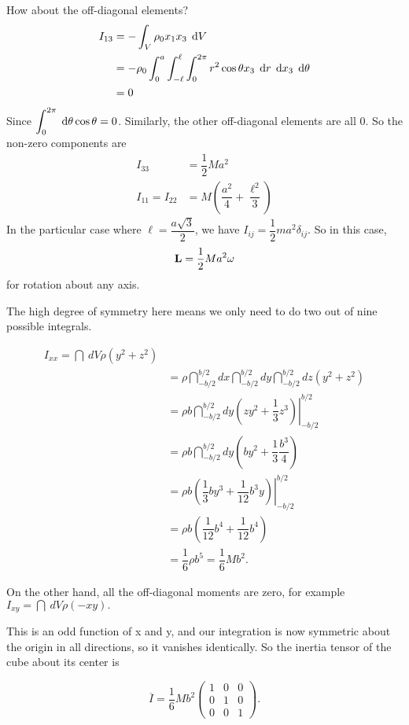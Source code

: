\begin{exa}
  How about the off-diagonal elements?
  \begin{align*}
    I_{13} &= -\dint_V \rho_0 x_1 x_3 \;\d V\\
    &= -\rho_0 \dint_0^a \dint_{-\ell}^\ell \dint_0^{2\pi} r^2 \cos \theta x_3 \;\d r\;\d x_3 \;\d \theta\\
    &= 0
  \end{align*}
  Since $\dint_0^{2\pi} \;\d \theta \cos \theta = 0$. Similarly, the other off-diagonal elements are all 0. So the non-zero components are
  \begin{align*}
    I_{33} &= \dfrac{1}{2}Ma^2\\
    I_{11} = I_{22} &= M\left(\dfrac{a^2}{4} + \dfrac{\ell^2}{3}\right)
  \end{align*}
  In the particular case where $\ell = \dfrac{a\sqrt{3}}{2}$, we have $I_{ij} = \dfrac{1}{2}ma^2 \delta_{ij}$. So in this case,
  \[
    \mathbf{ L} = \dfrac{1}{2}Ma^2 \omega
  \]
  for rotation about any axis.
\end{exa}

\begin{exa}

The high degree of symmetry here means we only need to do two out of nine possible integrals. 

\begin{align}
I_{xx} = \dint\ dV \rho (y^2 + z^2) \\  
&= \rho \dint_{-b/2}^{b/2} dx \dint_{-b/2}^{b/2} dy \dint_{-b/2}^{b/2} dz (y^2 + z^2) \\  
&= \rho b \dint_{-b/2}^{b/2} dy \left. (zy^2 + \dfrac{1}{3} z^3) \right|_{-b/2}^{b/2} \\  
&= \rho b \dint_{-b/2}^{b/2} dy \left( by^2 + \dfrac{1}{3} \dfrac{b^3}{4} \right) \\  
&= \rho b \left. \left( \dfrac{1}{3} by^3 + \dfrac{1}{12} b^3 y \right) \right|_{-b/2}^{b/2} \\  
&= \rho b \left( \dfrac{1}{12} b^4 + \dfrac{1}{12} b^4 \right) \\  
&= \dfrac{1}{6} \rho b^5 = \dfrac{1}{6} M b^2.
\end{align}

On the other hand, all the off-diagonal moments are zero, for example
$I_{xy} = \dint\ dV \rho (-xy).$

This is an odd function of x and y, and our integration is now symmetric about the origin in all directions, so it vanishes identically. So the inertia tensor of the cube about its center is

\[\overline{I} = \dfrac{1}{6} Mb^2 \left( \begin{array}{ccc} 1 & 0 & 0 \\ 0 & 1 & 0 \\ 0 & 0 & 1 \end{array} \right).\]
\end{exa}




